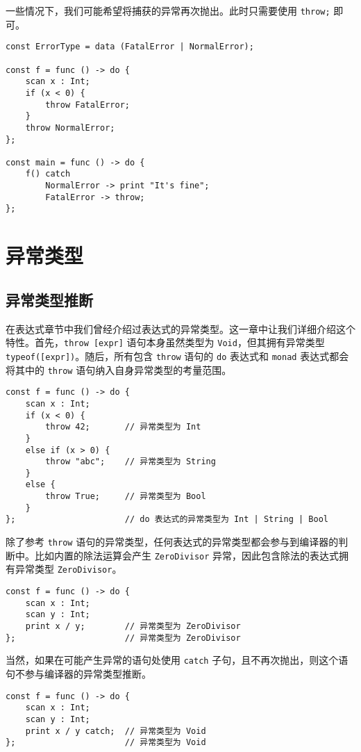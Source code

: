 一些情况下，我们可能希望将捕获的异常再次抛出。此时只需要使用 \lstinline!throw;! 即可。

\begin{lstlisting}
const ErrorType = data (FatalError | NormalError);

const f = func () -> do {
	scan x : Int;
	if (x < 0) {
		throw FatalError;
	}
	throw NormalError;
};

const main = func () -> do {
	f() catch
		NormalError -> print "It's fine";
		FatalError -> throw;
};
\end{lstlisting}

\section{异常类型}

\subsection{异常类型推断}

在表达式章节中我们曾经介绍过表达式的异常类型。这一章中让我们详细介绍这个特性。首先，\lstinline!throw [expr]! 语句本身虽然类型为 \lstinline!Void!，但其拥有异常类型 \lstinline!typeof([expr])!。随后，所有包含 \lstinline!throw! 语句的 \lstinline!do! 表达式和 \lstinline!monad! 表达式都会将其中的 \lstinline!throw! 语句纳入自身异常类型的考量范围。

\begin{lstlisting}
const f = func () -> do {
	scan x : Int;
	if (x < 0) {
		throw 42;		// 异常类型为 Int
	}
	else if (x > 0) {
		throw "abc";	// 异常类型为 String
	}
	else {
		throw True;		// 异常类型为 Bool
	}
};						// do 表达式的异常类型为 Int | String | Bool
\end{lstlisting}

除了参考 \lstinline!throw! 语句的异常类型，任何表达式的异常类型都会参与到编译器的判断中。比如内置的除法运算会产生 \lstinline!ZeroDivisor! 异常，因此包含除法的表达式拥有异常类型 \lstinline!ZeroDivisor!。

\begin{lstlisting}
const f = func () -> do {
	scan x : Int;
	scan y : Int;
	print x / y;		// 异常类型为 ZeroDivisor
};						// 异常类型为 ZeroDivisor
\end{lstlisting}

当然，如果在可能产生异常的语句处使用 \lstinline!catch! 子句，且不再次抛出，则这个语句不参与编译器的异常类型推断。

\begin{lstlisting}
const f = func () -> do {
	scan x : Int;
	scan y : Int;
	print x / y catch;	// 异常类型为 Void
};						// 异常类型为 Void
\end{lstlisting}

